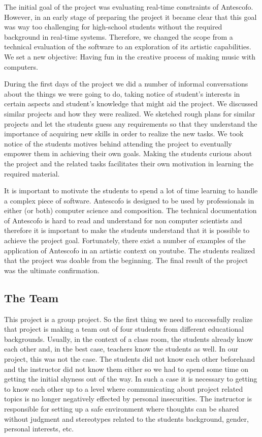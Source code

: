 \documentclass[onecolumn,nocopyrightspace,preprint]{sigplanconf}
\begin{document}
The initial goal of the project was evaluating real-time constraints of
Antescofo. However, in an early stage of preparing the project it became clear
that this goal was way too challenging for high-school students without the
required background in real-time systems. Therefore, we changed the scope from
a technical evaluation of the software to an exploration of its artistic
capabilities. We set a new objective: Having fun in the creative process of
making music with computers.

During the first days of the project we did a number of informal conversations
about the things we were going to do, taking notice of student's interests in
certain aspects and student's knowledge that might aid the project. We discussed
similar projects and how they were realized. We sketched rough plans for similar
projects and let the students guess any requirements so that they understand
the importance of acquiring new skills in order to realize the new tasks. We
took notice of the students motives behind attending the project to eventually
empower them in achieving their own goals. Making the students curious about the
project and the related tasks facilitates their own motivation in learning the
required material.

It is important to motivate the students to spend a lot of time learning to
handle a complex piece of software. Antescofo is designed to be used by
professionals in either (or both) computer science and composition. The
technical documentation of Antescofo is hard to read and understand for non
computer scientists and therefore it is important to make the students
understand that it is possible to achieve the project goal. Fortunately, there
exist a number of examples of the application of Antescofo in an artistic
context on youtube. The students realized that the project was doable from the
beginning. The final result of the project was the ultimate confirmation.

\subsection{The Team}\label{sec:team}

This project is a group project. So the first thing we need to successfully
realize that project is making a team out of four students from different
educational backgrounds. Usually, in the context of a class room, the students
already know each other and, in the best case, teachers know the students as
well. In our project, this was not the case. The students did not know each
other beforehand and the instructor did not know them either so we had to
spend some time on getting the initial shyness out of the way.
In such a case it is necessary to getting to know each other up to a level
where communicating about project related topics is no longer negatively
effected by personal insecurities. The instructor is responsible for setting
up a safe environment where thoughts can be shared without judgment and
stereotypes related to the students background, gender, personal interests, etc.
\end{document}
